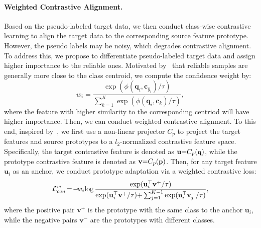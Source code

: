 \documentclass{article}
\begin{document}
\paragraph{Weighted Contrastive Alignment.} 
Based on the pseudo-labeled target data, we then conduct class-wise contrastive learning to align the target data to the corresponding source feature prototype.
However, the  pseudo labels may be noisy, which degrades contrastive alignment. To address this, we propose to differentiate pseudo-labeled target data and assign higher importance to the reliable ones. Motivated by~\cite{Chen2019ProgressiveFA} that reliable samples are generally more close to the class centroid, we compute the confidence weight by:
\begin{equation}
w_{i} = \frac{\exp(\phi(\textbf{q}_i, \textbf{c}_{\bar{y}_{i}})/\tau)}{\sum_{k=1}^{K}\exp(\phi(\textbf{q}_i, \textbf{c}_{k} )/\tau)}, 
\end{equation}  
where the feature with higher similarity to the corresponding centriod will have higher importance. 
Then, we can  conduct weighted contrastive alignment. To this end, inspired by~\cite{chen2020simple}, we first  use a non-linear projector $C_p$ to project the target features and source prototypes  to a $l_2$-normalized contrastive feature space. Specifically, the target contrastive feature is denoted as $\textbf{u} \small{=} C_{p}(\textbf{q})$, while the  prototype contrastive feature is  denoted as  $\textbf{v}  \small{=} C_{p}(\textbf{p})$. Then, for any target feature $\textbf{u}_{i}$ as an anchor, we conduct prototype adaptation via a weighted contrastive loss:
\begin{equation}
\label{eqn_lwc}
\mathcal{L}_{con}^{w} \!=\! -\! w_{i}\!\log\frac{\exp(\textbf{u}_{i}^{\top} \textbf{v}^+/\tau )}{\exp(\textbf{u}_{i}^{\top}  \textbf{v}^+/\tau) \small{+} \sum_{j=1}^{K\small{-}1}\exp(\textbf{u}_{i}^{\top} \textbf{v}^-_{j}/\tau)},
\end{equation}
where the positive pair  $\textbf{v}^+$ is the prototype with the same class to the anchor $\textbf{u}_{i}$, while the negative pairs $\textbf{v}^-$ are the prototypes with different classes. 
\end{document}
